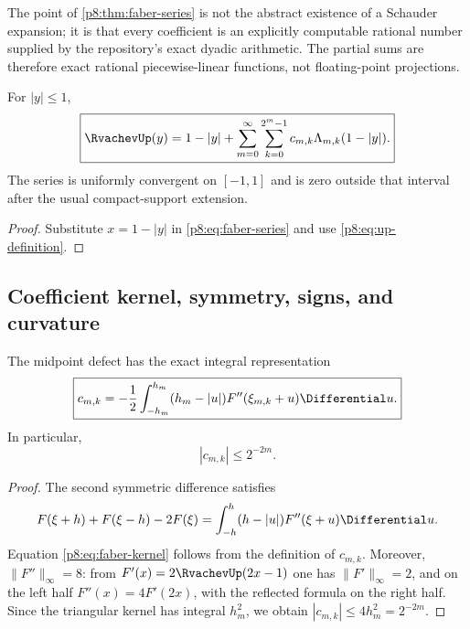 \documentclass[11pt]{article}
\theoremstyle{definition}
\theoremstyle{remark}
\begin{document}
\newresult The point of \cref{p8:thm:faber-series} is not the abstract existence
of a Schauder expansion; it is that every coefficient is an explicitly
computable rational number supplied by the repository's exact dyadic
arithmetic.  The partial sums are therefore exact rational piecewise-linear
functions, not floating-point projections.

\begin{corollary}
\label{p8:cor:up-faber}
For $|y|\le1$,
\begin{equation}
 \boxed{\displaystyle
 \RvachevUp(y)=1-|y|+
 \sum_{m=0}^\infty\sum_{k=0}^{2^m-1}
 c_{m,k}\Lambda_{m,k}(1-|y|).}                           \label{p8:eq:up-faber}
\end{equation}
The series is uniformly convergent on $[-1,1]$ and is zero outside that
interval after the usual compact-support extension.
\end{corollary}

\begin{proof}
Substitute $x=1-|y|$ in \eqref{p8:eq:faber-series} and use
\eqref{p8:eq:up-definition}.
\end{proof}

\subsection{Coefficient kernel, symmetry, signs, and curvature}

\begin{proposition}
\label{p8:prop:faber-kernel}
The midpoint defect has the exact integral representation
\begin{equation}
 \boxed{\displaystyle
 c_{m,k}=-\frac12\int_{-h_m}^{h_m}
 (h_m-|u|)F''(\xi_{m,k}+u)\Differential u.}                        \label{p8:eq:faber-kernel}
\end{equation}
In particular,
\begin{equation}
 |c_{m,k}|\le2^{-2m}.                                    \label{p8:eq:faber-bound}
\end{equation}
\end{proposition}

\begin{proof}
The second symmetric difference satisfies
\[
 F(\xi+h)+F(\xi-h)-2F(\xi)
 =\int_{-h}^{h}(h-|u|)F''(\xi+u)\Differential u.
\]
Equation \eqref{p8:eq:faber-kernel} follows from the definition of $c_{m,k}$.
Moreover, $\|F''\|_\infty=8$: from
$F'(x)=2\RvachevUp(2x-1)$ one has $\|F'\|_\infty=2$, and on the
left half $F''(x)=4F'(2x)$, with the reflected formula on the right half.
Since the triangular kernel has integral $h_m^2$, we obtain
$|c_{m,k}|\le4h_m^2=2^{-2m}$.
\end{proof}
\end{document}

